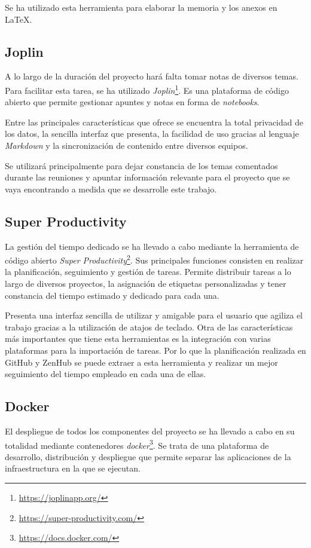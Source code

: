 Se ha utilizado esta herramienta para elaborar la memoria y los anexos en \LaTeX{}.

\subsection{Joplin}
A lo largo de la duración del proyecto hará falta tomar notas de diversos temas. Para facilitar esta tarea, se ha utilizado \textit{Joplin}\footnote{\url{https://joplinapp.org/}}. Es una plataforma de código abierto que permite gestionar apuntes y notas en forma de \textit{notebooks}.

Entre las principales características que ofrece se encuentra la total privacidad de los datos, la sencilla interfaz que presenta, la facilidad de uso gracias al lenguaje \textit{Markdown} y la sincronización de contenido entre diversos equipos.

Se utilizará principalmente para dejar constancia de los temas comentados durante las reuniones y apuntar información relevante para el proyecto que se vaya encontrando a medida que se desarrolle este trabajo.

\subsection{Super Productivity}
La gestión del tiempo dedicado se ha llevado a cabo mediante la herramienta de código abierto \textit{Super Productivity}\footnote{\url{https://super-productivity.com/}}. Sus principales funciones consisten en realizar la planificación, seguimiento y gestión de tareas. Permite distribuir tareas a lo largo de diversos proyectos, la asignación de etiquetas personalizadas y tener constancia del tiempo estimado y dedicado para cada una. 

Presenta una interfaz sencilla de utilizar y amigable para el usuario que agiliza el trabajo gracias a la utilización de atajos de teclado. Otra de las características más importantes que tiene esta herramientas es la integración con varias plataformas para la importación de tareas. Por lo que la planificación realizada en GitHub y ZenHub se puede extraer a esta herramienta y realizar un mejor seguimiento del tiempo empleado en cada una de ellas.

\subsection{Docker}

El despliegue de todos los componentes del proyecto se ha llevado a cabo en su totalidad mediante contenedores \textit{docker}\footnote{\url{https://docs.docker.com/}}. Se trata de una plataforma de desarrollo, distribución y despliegue que permite separar las aplicaciones de la infraestructura en la que se ejecutan.

